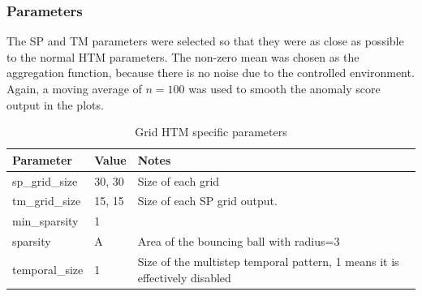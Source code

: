 \subsubsection{Parameters}
The SP and TM parameters were selected so that they were as close as possible to the normal HTM parameters. The non-zero mean was chosen as the aggregation function, because there is no noise due to the controlled environment. Again, a moving average of $n=100$ was used to smooth the anomaly score output in the plots.
\begin{table}[H]
    \centering
    \begin{tabularx}{\linewidth}{@{}XlX@{}}
        \toprule
        \textbf{Parameter} & \textbf{Value} & \textbf{Notes}                                                             \\
        \midrule
        sp\_grid\_size     & 30, 30         & Size of each grid                                                          \\
        tm\_grid\_size     & 15, 15         & Size of each SP grid output.                                               \\
        min\_sparsity      & 1              &                                                                            \\
        sparsity           & A              & Area of the bouncing ball with radius=3                                    \\
        temporal\_size     & 1              & Size of the multistep temporal pattern, 1 means it is effectively disabled \\
        \bottomrule
    \end{tabularx}
    \caption{Grid HTM specific parameters}
    \label{tab:bb_gridhtm_params}
\end{table}
